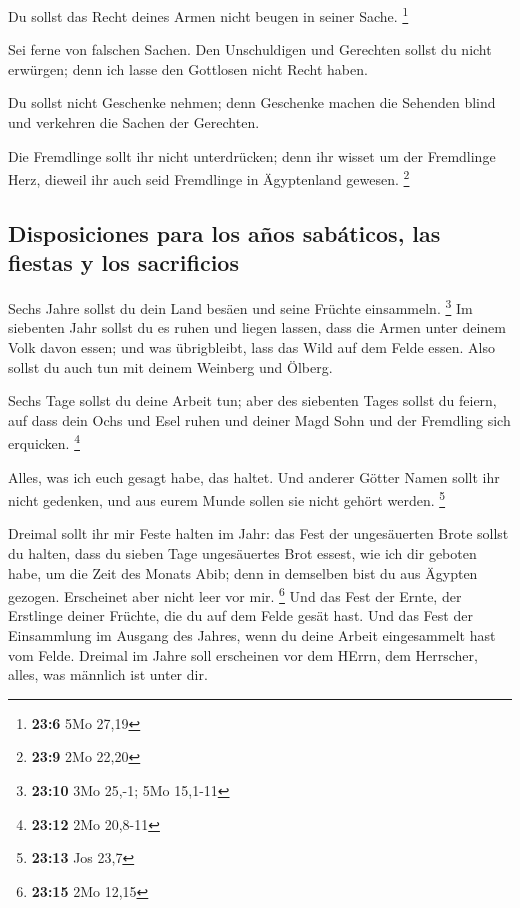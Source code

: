  Du sollst das Recht deines Armen nicht beugen in seiner
Sache. \footnote{\textbf{23:6} 5Mo 27,19}

 Sei ferne von falschen Sachen. Den Unschuldigen und
Gerechten sollst du nicht erwürgen; denn ich lasse den Gottlosen nicht
Recht haben.

 Du sollst nicht Geschenke nehmen; denn Geschenke machen
die Sehenden blind und verkehren die Sachen der Gerechten.

 Die Fremdlinge sollt ihr nicht unterdrücken; denn ihr
wisset um der Fremdlinge Herz, dieweil ihr auch seid Fremdlinge in
Ägyptenland gewesen. \footnote{\textbf{23:9} 2Mo 22,20}

\hypertarget{disposiciones-para-los-auxf1os-sabuxe1ticos-las-fiestas-y-los-sacrificios}{%
\subsection{Disposiciones para los años sabáticos, las fiestas y los
sacrificios}\label{disposiciones-para-los-auxf1os-sabuxe1ticos-las-fiestas-y-los-sacrificios}}

 Sechs Jahre sollst du dein Land besäen und seine Früchte
einsammeln. \footnote{\textbf{23:10} 3Mo 25,-1; 5Mo 15,1-11}
 Im siebenten Jahr sollst du es ruhen und liegen lassen,
dass die Armen unter deinem Volk davon essen; und was übrigbleibt, lass
das Wild auf dem Felde essen. Also sollst du auch tun mit deinem
Weinberg und Ölberg.

 Sechs Tage sollst du deine Arbeit tun; aber des
siebenten Tages sollst du feiern, auf dass dein Ochs und Esel ruhen und
deiner Magd Sohn und der Fremdling sich erquicken. \footnote{\textbf{23:12}
  2Mo 20,8-11}

 Alles, was ich euch gesagt habe, das haltet. Und anderer
Götter Namen sollt ihr nicht gedenken, und aus eurem Munde sollen sie
nicht gehört werden. \footnote{\textbf{23:13} Jos 23,7}

 Dreimal sollt ihr mir Feste halten im Jahr:
 das Fest der ungesäuerten Brote sollst du halten, dass
du sieben Tage ungesäuertes Brot essest, wie ich dir geboten habe, um
die Zeit des Monats Abib; denn in demselben bist du aus Ägypten gezogen.
Erscheinet aber nicht leer vor mir. \footnote{\textbf{23:15} 2Mo 12,15}
 Und das Fest der Ernte, der Erstlinge deiner Früchte,
die du auf dem Felde gesät hast. Und das Fest der Einsammlung im Ausgang
des Jahres, wenn du deine Arbeit eingesammelt hast vom Felde.
 Dreimal im Jahre soll erscheinen vor dem HErrn, dem
Herrscher, alles, was männlich ist unter dir.

